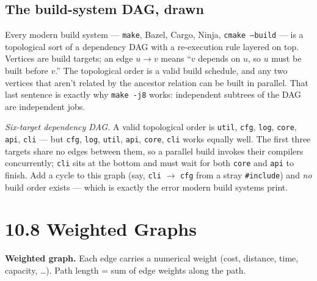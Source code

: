 \documentclass[11pt]{article}
\begin{document}
\subsection*{The build-system DAG, drawn}

Every modern build system --- \texttt{make}, Bazel, Cargo, Ninja,
\texttt{cmake --build} --- is a topological sort of a dependency
DAG with a re-execution rule layered on top. Vertices are build
targets; an edge $u \to v$ means ``$v$ depends on $u$, so $u$
must be built before $v$.'' The topological order is a valid
build schedule, and any two vertices that aren't related by the
ancestor relation can be built in parallel. That last sentence is
exactly why \texttt{make -j8} works: independent subtrees of the
DAG are independent jobs.

\begin{center}
\end{center}

\emph{Six-target dependency DAG.}
A valid topological order is
\texttt{util}, \texttt{cfg}, \texttt{log}, \texttt{core},
\texttt{api}, \texttt{cli} --- but
\texttt{cfg}, \texttt{log}, \texttt{util}, \texttt{api},
\texttt{core}, \texttt{cli} works equally well. The first three
targets share no edges between them, so a parallel build invokes
their compilers concurrently; \texttt{cli} sits at the bottom and
must wait for both \texttt{core} and \texttt{api} to finish.
Add a cycle to this graph (say,
\texttt{cli} $\to$ \texttt{cfg} from a stray \texttt{\#include})
and \emph{no} build order exists --- which is exactly the error
modern build systems print.

\section{10.8 Weighted Graphs}

\begin{defnbox}
\textbf{Weighted graph.} Each edge carries a numerical weight (cost, distance, time, capacity, \ldots). Path length = sum of edge weights along the path.
\end{defnbox}
\end{document}
